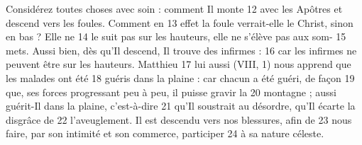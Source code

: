Considérez toutes choses avec soin : comment Il monte	 
12	 	avec les Apôtres et descend vers les foules. Comment en	 
13	 	effet la foule verrait-elle le Christ, sinon en bas ? Elle ne	 
14	 	le suit pas sur les hauteurs, elle ne s'élève pas aux som-	 
15	 	mets. Aussi bien, dès qu'Il descend, Il trouve des infirmes :	 
16	 	car les infirmes ne peuvent être sur les hauteurs. Matthieu	 
17	 	lui aussi (VIII, 1) nous apprend que les malades ont été	 
18	 	guéris dans la plaine : car chacun a été guéri, de façon	 
19	 	que, ses forces progressant peu à peu, il puisse gravir la	 
20	 	montagne ; aussi guérit-Il dans la plaine, c'est-à-dire	 
21	 	qu'Il soustrait au désordre, qu'Il écarte la disgrâce de	 
22	 	l'aveuglement. Il est descendu vers nos blessures, afin de	 
23	 	nous faire, par son intimité et son commerce, participer	 
24	 	à sa nature céleste.